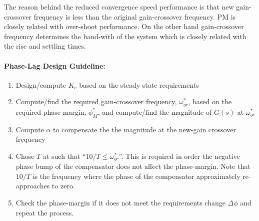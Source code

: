 \documentclass[twoside]{article}
\begin{document}
The reason behind the reduced convergence speed performance is that
new gain-crossover frequency is less than the original gain-crossover frequency.
PM is closely related with over-shoot performance. On the other hand
gain-crossover frequency determines the band-with of the system 
which is closely related with the rise and settling times. 

\paragraph{Phase-Lag Design Guideline:} 
\begin{enumerate}
	\item Design/compute $K_c$ based on the steady-state requirements 
	\item Compute/find the required gain-crossover
	frequency, $\omega_{gc}^*$, based on
	the required phase-margin, $\phi^*_M$, and compute/find 
	the magnitude of $G(s)$ at $\omega_{gc}^*$
	\item Compute $\alpha$ to compensate the 
	the magnitude at the new-gain crossover frequency
	\item Chose $T$ at such that ``$10/T \leq \omega_{gc}^*$''. This is required in order the
          negative phase bump of the compensator does not affect the
          phase-margin. Note that $10/T$ is the frequency where the phase of the compensator
          approximately re-approaches to zero.
	\item Check the phase-margin if it does not meet the requirements
	change $\Delta \phi$ and repeat the process. 
\end{enumerate}


\end{document}
